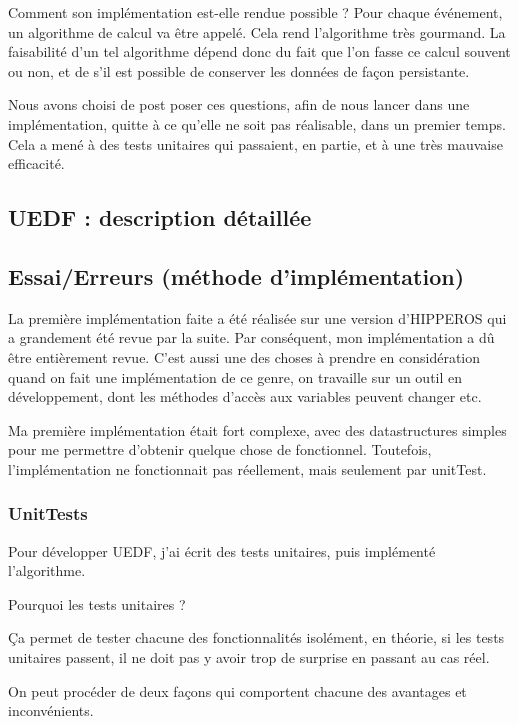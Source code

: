 	Comment son implémentation est-elle rendue possible ? Pour chaque événement, un algorithme de calcul va être appelé.
	Cela rend l'algorithme très gourmand. La faisabilité d'un tel algorithme dépend donc du fait que l'on fasse ce calcul souvent ou non, et de s'il est possible de conserver les données de façon persistante. 
	
	Nous avons choisi de post poser ces questions, afin de nous lancer dans une implémentation, quitte à 
	ce qu'elle ne soit pas réalisable, dans un premier temps. Cela a mené à des tests unitaires qui 
	passaient, en partie, et à une très mauvaise efficacité. 
	
	
	\subsection{UEDF : description détaillée}
	
	
	
	\subsection{Essai/Erreurs (méthode d'implémentation)}
	La première implémentation faite a été réalisée sur une version d'HIPPEROS qui a grandement été revue par la suite. Par conséquent, mon implémentation a dû être entièrement revue. C'est aussi une des choses à prendre en
	 considération quand on fait une implémentation de ce genre, on travaille sur un outil en développement, 
	 dont les méthodes d'accès aux variables peuvent changer etc.
	 
	 Ma première implémentation était fort complexe, avec des datastructures simples pour me permettre d'obtenir
	 quelque chose de fonctionnel. Toutefois, l'implémentation ne fonctionnait pas réellement, 
	 mais seulement par unitTest.
	 
	 \subsubsection{UnitTests}
	 Pour développer UEDF, j'ai écrit des tests unitaires, puis implémenté l'algorithme. 
	 
	 Pourquoi les tests unitaires ?
	 
	 Ça permet de tester chacune des fonctionnalités isolément, en théorie, si les tests unitaires passent, 
	 il ne doit pas y avoir trop de surprise en passant au cas réel.
	 
	 On peut procéder de deux façons qui comportent chacune des avantages et inconvénients.
	 
